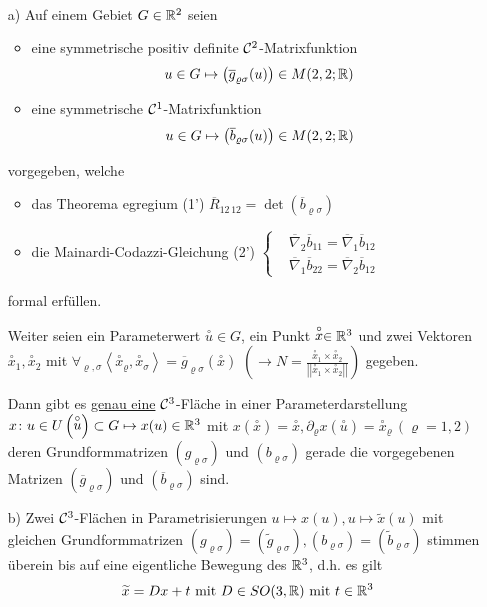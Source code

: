 \setcounter{set}{3}
\begin{satz}\label{satz254}\(\)
 \begin{enumerate}
  \item[a)] Auf einem Gebiet \(G \in \mathbb{R}^2\) seien
  \begin{itemize}
   \item eine symmetrische positiv definite \(\mathcal{C}^2\)-Matrixfunktion
   \[    u \in G \mapsto \big(\overline g_{\varrho \sigma}(u)\big) \in M(2,2;\mathbb{R})
   \]
   \item eine symmetrische \(\mathcal{C}^1\)-Matrixfunktion
   \[
    u \in G \mapsto \big(\overline b_{\varrho \sigma}(u)\big) \in M(2,2;\mathbb{R})
   \]
  \end{itemize}
  vorgegeben, welche
  \begin{itemize}
   \item das Theorema egregium (1') \(\overline R_{12 \, 12} = \det (\overline b_{\varrho \sigma})\)
   \item die Mainardi-Codazzi-Gleichung (2') \(\begin{cases}
                                                &\overline \nabla_2 \overline b_{11} = \overline \nabla_1 \overline b_{12} \\
                                                &\overline \nabla_1 \overline b_{22} = \overline \nabla_2 \overline b_{12}
                                               \end{cases}\) 
  \end{itemize}
  formal erfüllen. \par
  Weiter seien ein Parameterwert \(\stackrel \circ u \in G\), ein Punkt \(\stackrel \circ x \in \mathbb{R}^3\) und zwei Vektoren \(\stackrel \circ x_1, \stackrel \circ x_2\) mit \(\forall_{\varrho, \sigma} \left\langle \stackrel \circ x_\varrho, \stackrel \circ x_\sigma \right\rangle = \overline g_{\varrho \sigma} \left(\stackrel \circ x\right)\)  \(\left( \to N = \frac{\stackrel \circ x_1 \times \stackrel \circ x_2}{\left|\left|\stackrel \circ x_1 \times \stackrel \circ x_2 \right|\right|}\right)\) gegeben. \par
  Dann gibt es \uline{genau eine} \(\mathcal{C}^3\)-Fläche in einer Parameterdarstellung \(x \colon u \in U\left(\stackrel \circ u\right) \subset G \mapsto x(u) \in \mathbb{R}^3\) mit \(x\left(\stackrel \circ x\right) = \stackrel \circ x, \partial_\varrho x\left(\stackrel \circ u\right) = \stackrel \circ x_\varrho \, (\varrho = 1,2)\) deren Grundformmatrizen \((g_{\varrho \sigma})\) und \((b_{\varrho \sigma})\) gerade die vorgegebenen Matrizen \(\left(\overline g_{\varrho \sigma}\right)\) und \(\left(\overline b_{\varrho \sigma}\right)\) sind.
  \item[b)] Zwei \(\mathcal{C}^3\)-Flächen in Parametrisierungen \(u \mapsto x(u), u \mapsto \widetilde x(u)\) mit gleichen Grundformmatrizen \((g_{\varrho \sigma}) =(\widetilde g_{\varrho \sigma}), (b_{\varrho \sigma}) = (\widetilde b_{\varrho \sigma})\) stimmen überein bis auf eine eigentliche Bewegung des \(\mathbb{R}^3\), d.h. es gilt
  \[
   \widetilde x = Dx + t \text{ mit } D \in SO(3,\mathbb{R}) \text{ mit } t \in \mathbb{R}^3
  \]
 \end{enumerate}
\end{satz}

